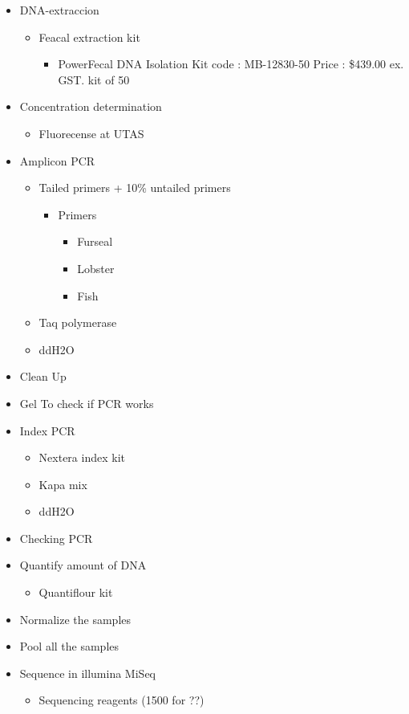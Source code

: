 \documentclass[11pt]{article}
\begin{document}
\begin{itemize}
\item DNA-extraccion
\begin{itemize}
\item Feacal extraction kit
\begin{itemize}
\item PowerFecal DNA Isolation Kit code : MB-12830-50
       Price : \$439.00 ex. GST. kit of 50
\end{itemize}
\end{itemize}
\item Concentration determination
\begin{itemize}
\item Fluorecense at UTAS
\end{itemize}
\item Amplicon PCR
\begin{itemize}
\item Tailed primers  + 10\% untailed primers
\begin{itemize}
\item Primers
\begin{itemize}
\item Furseal
\item Lobster
\item Fish
\end{itemize}
\end{itemize}
\item Taq polymerase
\item ddH2O
\end{itemize}
\item Clean Up
\item Gel
   To check if PCR works
\item Index PCR
\begin{itemize}
\item Nextera index kit
\item Kapa mix
\item ddH2O
\end{itemize}
\item Checking PCR
\item Quantify amount of DNA
\begin{itemize}
\item Quantiflour kit
\end{itemize}
\item Normalize the samples
\item Pool all the samples
\item Sequence in illumina MiSeq
\begin{itemize}
\item Sequencing reagents (1500 for ??)
\end{itemize}
\end{itemize}
\end{document}
